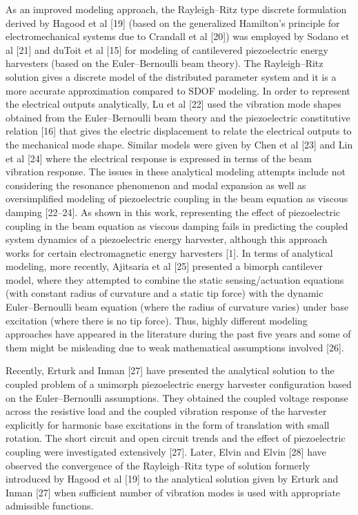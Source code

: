 \documentclass{article}
\begin{document}
As an improved modeling approach, the Rayleigh–Ritz type discrete formulation derived by Hagood et al [19] (based on the generalized Hamilton’s principle for electromechanical systems due to Crandall et al [20]) was employed by Sodano et al [21] and duToit et al [15] for modeling of cantilevered piezoelectric energy harvesters (based on the Euler–Bernoulli beam theory). The Rayleigh–Ritz solution gives a discrete model of the distributed parameter system and it is a more accurate approximation compared to SDOF modeling. In order to represent the electrical outputs analytically, Lu et al [22] used the vibration mode shapes obtained from the Euler–Bernoulli beam theory and the piezoelectric constitutive relation [16] that gives the electric displacement to relate the electrical outputs to the mechanical mode shape. Similar models were given by Chen et al [23] and Lin et al [24] where the electrical response is expressed in terms of the beam vibration response. The issues in these analytical modeling attempts include not considering the resonance phenomenon and modal expansion as well as oversimplified modeling of piezoelectric coupling in the beam equation as viscous damping [22–24]. As shown in this work, representing the effect of piezoelectric coupling in the beam equation as viscous damping fails in predicting the coupled system dynamics of a piezoelectric energy harvester, although this approach works for certain electromagnetic energy harvesters [1]. In terms of analytical modeling, more recently, Ajitsaria et al [25] presented a bimorph cantilever model, where they attempted to combine the static sensing/actuation equations (with constant radius of curvature and a static tip force) with the dynamic Euler–Bernoulli beam equation (where the radius of curvature varies) under base excitation (where there is no tip force). Thus, highly different modeling approaches have appeared in the literature during the past five years and some of them might be misleading due to weak mathematical assumptions involved [26]. 

Recently, Erturk and Inman [27] have presented the analytical solution to the coupled problem of a unimorph piezoelectric energy harvester configuration based on the Euler–Bernoulli assumptions. They obtained the coupled voltage response across the resistive load and the coupled vibration response of the harvester explicitly for harmonic base excitations in the form of translation with small rotation. The short circuit and open circuit trends and the effect of piezoelectric coupling were investigated extensively [27]. Later, Elvin and Elvin [28] have observed the convergence of the Rayleigh–Ritz type of solution formerly introduced by Hagood et al [19] to the analytical solution given by Erturk and Inman [27] when sufficient number of vibration modes is used with appropriate admissible functions.
\end{document}
